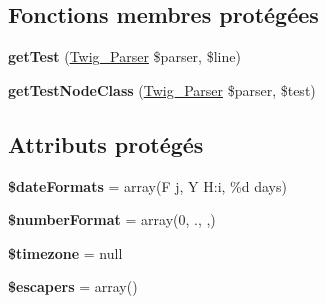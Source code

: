 \subsection*{Fonctions membres protégées}
\begin{DoxyCompactItemize}
\item 
{\bfseries get\+Test} (\hyperlink{class_twig___parser}{Twig\+\_\+\+Parser} \$parser, \$line)\hypertarget{class_twig___extension___core_a7b8fa6e45ce1b3ba0ea0118e0800e3d4}{}\label{class_twig___extension___core_a7b8fa6e45ce1b3ba0ea0118e0800e3d4}

\item 
{\bfseries get\+Test\+Node\+Class} (\hyperlink{class_twig___parser}{Twig\+\_\+\+Parser} \$parser, \$test)\hypertarget{class_twig___extension___core_ac2e033573a56963845eb4c079f08c4ec}{}\label{class_twig___extension___core_ac2e033573a56963845eb4c079f08c4ec}

\end{DoxyCompactItemize}
\subsection*{Attributs protégés}
\begin{DoxyCompactItemize}
\item 
{\bfseries \$date\+Formats} = array(\textquotesingle{}F j, Y H\+:i\textquotesingle{}, \textquotesingle{}\%d days\textquotesingle{})\hypertarget{class_twig___extension___core_a2fc93ea5327f655d3ed306e221ee33f0}{}\label{class_twig___extension___core_a2fc93ea5327f655d3ed306e221ee33f0}

\item 
{\bfseries \$number\+Format} = array(0, \textquotesingle{}.\textquotesingle{}, \textquotesingle{},\textquotesingle{})\hypertarget{class_twig___extension___core_a352ef5f1b2f5974072bd8037e20446c9}{}\label{class_twig___extension___core_a352ef5f1b2f5974072bd8037e20446c9}

\item 
{\bfseries \$timezone} = null\hypertarget{class_twig___extension___core_af1cceca0f6633f202e2e3eccb72912af}{}\label{class_twig___extension___core_af1cceca0f6633f202e2e3eccb72912af}

\item 
{\bfseries \$escapers} = array()\hypertarget{class_twig___extension___core_aa3a97e2818a50c6d398a50066a02976c}{}\label{class_twig___extension___core_aa3a97e2818a50c6d398a50066a02976c}

\end{DoxyCompactItemize}


